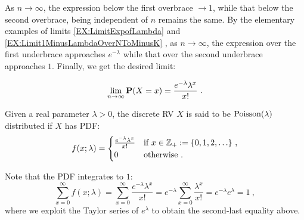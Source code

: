 As $n \to \infty$, the expression below the first overbrace $\to 1$, while that below the second overbrace, being independent of $n$ remains the same.  By the elementary examples of limits
\ref*{EX:LimitExpofLambda} and \ref*{EX:Limit1MinusLambdaOverNToMinusK}%
, as $n \to \infty$, the expression over the first underbrace approaches $e^{-\lambda}$ while that over the second underbrace approaches $1$.  Finally, we get the desired limit:

\[
\lim_{n \to \infty} \mathbf{P}(X=x)
= \frac{ e^{-\lambda} \lambda^x}{x!}  \ .
\]
\begin{model}\label{M:Poisson}
Given a real parameter $\lambda>0$, the discrete RV $X$ is said to be $\mbox{{\rm Poisson}}(\lambda)$ distributed if $X$ has PDF:
\begin{equation}\label{E:Poissonpdf}
f(x;\lambda) =
\begin{cases}
 \frac{ e^{-\lambda} \lambda^x}{x!} & \text{if $x \in \mathbb{Z}_+ := \{0,1,2,\ldots\}$} \ , \\
0 & \text{otherwise} \ .
\end{cases}
\end{equation}

Note that the PDF integrates to $1$:
\[
\sum_{x=0}^{\infty} f(x;\lambda)
= \sum_{x=0}^{\infty}  \frac{ e^{-\lambda} \lambda^x}{x!}
=  e^{-\lambda} \sum_{x=0}^{\infty}  \frac{\lambda^x}{x!}
=  e^{-\lambda} e^{\lambda}
= 1 \ ,
\]
where we exploit the Taylor series of $e^{\lambda}$ to obtain the second-last equality above.
\end{model}

